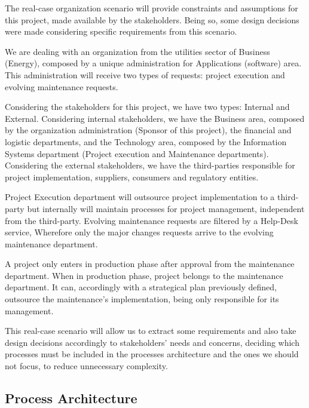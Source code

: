 The real-case organization scenario will provide constraints and assumptions for this project, made available by the stakeholders. Being so, some design decisions were made considering specific requirements from this scenario.\par
We are dealing with an organization from the utilities sector of Business (Energy), composed by a unique administration for Applications (software) area. This administration will receive two types of requests: project execution and evolving maintenance requests.\par
Considering the stakeholders for this project, we have two types: Internal and External. Considering internal stakeholders, we have the Business area, composed by the organization administration (Sponsor of this project), the financial and logistic departments, and the Technology area, composed by the Information Systems department (Project execution and Maintenance departments). Considering the external stakeholders, we have the third-parties responsible for project implementation, suppliers, consumers and regulatory entities.\par
Project Execution department will outsource project implementation to a third-party but internally will maintain processes for project management, independent from the third-party. Evolving maintenance requests are filtered by a Help-Desk service, Wherefore only the major changes requests arrive to the evolving maintenance department.\par
A project only enters in production phase after approval from the maintenance department. When in production phase, project belongs to the maintenance department. It can, accordingly with a strategical plan previously defined, outsource the maintenance's implementation, being only responsible for its management.\par
This real-case scenario will allow us to extract some requirements and also take design decisions accordingly to stakeholders' needs and concerns, deciding which processes must be included in the processes architecture and the ones we should not focus, to reduce unnecessary complexity.\par


\subsection{Process Architecture}

